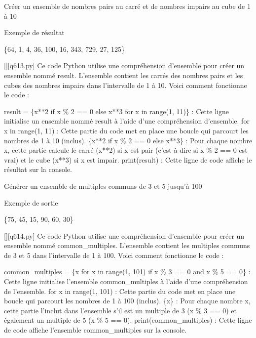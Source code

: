         \question
        Créer un ensemble de nombres pairs au carré et de nombres impairs au cube de 1 à 10

Exemple de résultat

\{64, 1, 4, 36, 100, 16, 343, 729, 27, 125\}
        \par
        \begin{solution}
            \renewcommand{\nomfichier}{q613.py}
            \pythonfile{\chemincode \nomfichier}[][\nomfichier]
            Ce code Python utilise une compréhension d'ensemble pour créer un ensemble nommé result. L'ensemble contient les carrés des nombres pairs et les cubes des nombres impairs dans l'intervalle de 1 à 10. Voici comment fonctionne le code :

    result = \{x**2 if x \% 2 == 0 else x**3 for x in range(1, 11)\} : Cette ligne initialise un ensemble nommé result à l'aide d'une compréhension d'ensemble.
        for x in range(1, 11) : Cette partie du code met en place une boucle qui parcourt les nombres de 1 à 10 (inclus).
        \{x**2 if x \% 2 == 0 else x**3\} : Pour chaque nombre x, cette partie calcule le carré (x**2) si x est pair (c'est-à-dire si x \% 2 == 0 est vrai) et le cube (x**3) si x est impair.
    print(result) : Cette ligne de code affiche le résultat sur la console.
        \end{solution}
        

        \question
        Générer un ensemble de multiples communs de 3 et 5 jusqu'à 100

Exemple de sortie

\{75, 45, 15, 90, 60, 30\}
        \par
        \begin{solution}
            \renewcommand{\nomfichier}{q614.py}
            \pythonfile{\chemincode \nomfichier}[][\nomfichier]
            Ce code Python utilise une compréhension d'ensemble pour créer un ensemble nommé common\_multiples. L'ensemble contient les multiples communs de 3 et 5 dans l'intervalle de 1 à 100. Voici comment fonctionne le code :

    common\_multiples = \{x for x in range(1, 101) if x \% 3 == 0 and x \% 5 == 0\} : Cette ligne initialise l'ensemble common\_multiples à l'aide d'une compréhension de l'ensemble.
        for x in range(1, 101) : Cette partie du code met en place une boucle qui parcourt les nombres de 1 à 100 (inclus).
        \{x\} : Pour chaque nombre x, cette partie l'inclut dans l'ensemble s'il est un multiple de 3 (x \% 3 == 0) et également un multiple de 5 (x \% 5 == 0).
    print(common\_multiples) : Cette ligne de code affiche l'ensemble common\_multiples sur la console.
        \end{solution}
        

